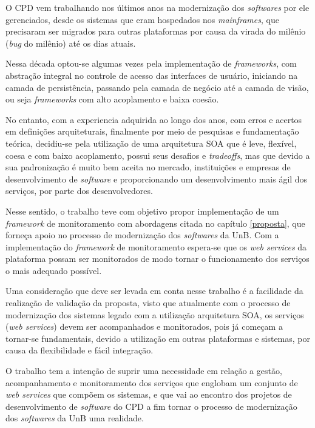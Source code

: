 \label{consideracoes_finais}

O \acrshort{CPD} vem trabalhando nos últimos anos na modernização dos \textit{softwares} por ele gerenciados, desde os sistemas que eram hospedados nos \textit{mainframes}, que precisaram ser migrados para outras plataformas por causa da virada do milênio (\textit{bug} do milênio) até os dias atuais. 

Nessa década optou-se algumas vezes pela implementação de \textit{frameworks}, com abstração integral no controle de acesso das interfaces de usuário, iniciando na camada de persistência, passando pela camada de negócio até a camada de visão, ou seja \textit{frameworks} com alto acoplamento e baixa coesão. 

No entanto, com a experiencia adquirida ao longo dos anos, com erros e acertos em definições arquiteturais, finalmente por meio de pesquisas e fundamentação teórica, decidiu-se pela utilização de uma arquitetura \acrshort{SOA} que é leve, flexível, coesa e com baixo acoplamento, possui seus desafios e \textit{tradeoffs}, mas que devido a sua padronização é muito bem aceita no mercado, instituições e empresas de desenvolvimento de \textit{software} e proporcionando um desenvolvimento mais ágil dos serviços, por parte dos desenvolvedores.    

Nesse sentido, o trabalho teve com objetivo propor implementação de um \textit{framework} de monitoramento com abordagens citada no capítulo \ref{proposta}, que forneça apoio no processo de modernização dos \textit{softwares} da UnB.
Com a implementação do \textit{framework} de monitoramento espera-se que os \textit{web services} da plataforma possam ser monitorados de modo tornar o funcionamento dos serviços o mais adequado possível.  

Uma consideração que deve ser levada em conta nesse trabalho é a facilidade da realização de validação da proposta, visto que atualmente com o processo de modernização dos sistemas legado com a utilização arquitetura \acrshort{SOA}, os serviços (\textit{web services}) devem ser acompanhados e monitorados, pois já começam a tornar-se fundamentais, devido a utilização em outras plataformas e sistemas, por causa da flexibilidade e fácil integração. 

O trabalho tem a intenção de suprir uma necessidade em relação a gestão, acompanhamento e monitoramento dos serviços que englobam um conjunto de \textit{web services} que compõem os sistemas, e que vai ao encontro dos projetos de desenvolvimento de \textit{software} do \acrshort{CPD} a fim tornar o processo de modernização dos \textit{softwares} da \acrshort{UnB} uma realidade.
